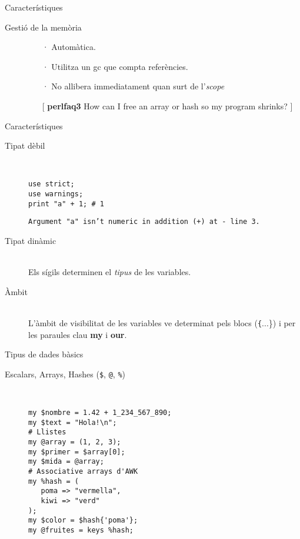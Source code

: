 \documentclass{beamer}
\newcommand{\cita}[1]{%
  \begin{flushright}%
    \tiny{[ #1 ]}%
  \end{flushright} %
}
\begin{document}
\begin{frame}{Característiques}
  \begin{description}
    \item[Gestió de la memòria] \hfill
      \begin{itemize}
        \item[·] Automàtica.
        \item[·] Utilitza un gc que compta referències.
        \item[·] No allibera immediatament quan surt de l'\emph{scope}
          \cita{\textbf{perlfaq3} How can I free an array or hash so my program shrinks?}
      \end{itemize}
  \end{description}
\end{frame}

\begin{frame}[fragile]{Característiques}
  \begin{description}
    \item[Tipat dèbil] \hfill \\
      \begin{lstlisting}
use strict;
use warnings;
print "a" + 1; # 1
      \end{lstlisting}
      {\footnotesize\texttt{Argument "a" isn't numeric in addition (+) at - line 3.}}
  \item[Tipat dinàmic] \hfill \\
    Els sígils determinen el \emph{tipus} de les variables.
  \item[Àmbit] \hfill \\
    L'àmbit de visibilitat de les variables ve determinat pels blocs
    (\texttt\{...\}) i per les paraules clau \textbf{my} i
    \textbf{our}.
  \end{description}
\end{frame}

\begin{frame}[fragile]{Tipus de dades bàsics}
  \begin{description}
    \item[Escalars, Arrays, Hashes (\texttt{\$}, \texttt{@}, \texttt{\%})] \hfill\\
      \begin{lstlisting}
my $nombre = 1.42 + 1_234_567_890;
my $text = "Hola!\n";
# Llistes
my @array = (1, 2, 3);
my $primer = $array[0];
my $mida = @array;
# Associative arrays d'AWK
my %hash = (
   poma => "vermella",
   kiwi => "verd"
);
my $color = $hash{'poma'};
my @fruites = keys %hash;
      \end{lstlisting}
  \end{description}
\end{frame}
\end{document}
